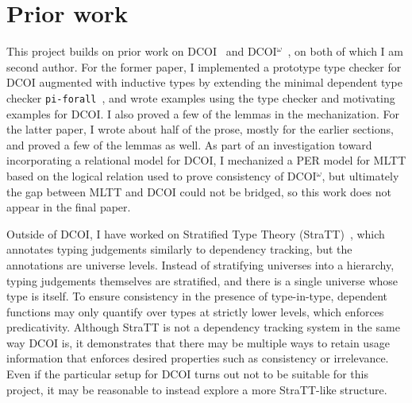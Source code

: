 \documentclass{article}
\begin{document}

\section{Prior work} \label{sec:prior}

This project builds on prior work on DCOI~\citep{dcoi} and DCOI$^\omega$~\citep{dcoi-omega},
on both of which I am second author.
For the former paper,
I implemented a prototype type checker for DCOI augmented with inductive types
by extending the minimal dependent type checker \texttt{pi-forall}~\citep{pi-forall},
and wrote examples using the type checker and motivating examples for DCOI.
I also proved a few of the lemmas in the mechanization.
For the latter paper,
I wrote about half of the prose, mostly for the earlier sections,
and proved a few of the lemmas as well.
As part of an investigation toward incorporating a relational model for DCOI,
I mechanized a PER model for MLTT based on the logical relation
used to prove consistency of DCOI$^\omega$,
but ultimately the gap between MLTT and DCOI could not be bridged,
so this work does not appear in the final paper.

Outside of DCOI, I have worked on Stratified Type Theory (StraTT)~\citep{stratt},
which annotates typing judgements similarly to dependency tracking,
but the annotations are universe levels.
Instead of stratifying universes into a hierarchy,
typing judgements themselves are stratified,
and there is a single universe whose type is itself.
To ensure consistency in the presence of type-in-type,
dependent functions may only quantify over types at strictly lower levels,
which enforces predicativity.
Although StraTT is not a dependency tracking system in the same way DCOI is,
it demonstrates that there may be multiple ways to retain usage information
that enforces desired properties such as consistency or irrelevance.
Even if the particular setup for DCOI turns out not to be suitable for this project,
it may be reasonable to instead explore a more StraTT-like structure.
\end{document}
